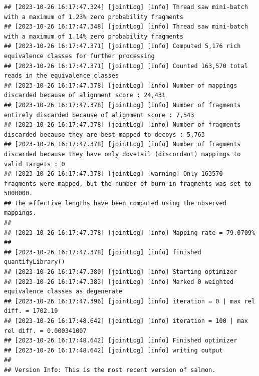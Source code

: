 \documentclass[
]{book}
\begin{document}
\begin{verbatim}
## [2023-10-26 16:17:47.324] [jointLog] [info] Thread saw mini-batch with a maximum of 1.23% zero probability fragments
## [2023-10-26 16:17:47.348] [jointLog] [info] Thread saw mini-batch with a maximum of 1.14% zero probability fragments
## [2023-10-26 16:17:47.371] [jointLog] [info] Computed 5,176 rich equivalence classes for further processing
## [2023-10-26 16:17:47.371] [jointLog] [info] Counted 163,570 total reads in the equivalence classes 
## [2023-10-26 16:17:47.378] [jointLog] [info] Number of mappings discarded because of alignment score : 24,431
## [2023-10-26 16:17:47.378] [jointLog] [info] Number of fragments entirely discarded because of alignment score : 7,543
## [2023-10-26 16:17:47.378] [jointLog] [info] Number of fragments discarded because they are best-mapped to decoys : 5,763
## [2023-10-26 16:17:47.378] [jointLog] [info] Number of fragments discarded because they have only dovetail (discordant) mappings to valid targets : 0
## [2023-10-26 16:17:47.378] [jointLog] [warning] Only 163570 fragments were mapped, but the number of burn-in fragments was set to 5000000.
## The effective lengths have been computed using the observed mappings.
## 
## [2023-10-26 16:17:47.378] [jointLog] [info] Mapping rate = 79.0709%
## 
## [2023-10-26 16:17:47.378] [jointLog] [info] finished quantifyLibrary()
## [2023-10-26 16:17:47.380] [jointLog] [info] Starting optimizer
## [2023-10-26 16:17:47.383] [jointLog] [info] Marked 0 weighted equivalence classes as degenerate
## [2023-10-26 16:17:47.396] [jointLog] [info] iteration = 0 | max rel diff. = 1702.19
## [2023-10-26 16:17:48.642] [jointLog] [info] iteration = 100 | max rel diff. = 0.000341007
## [2023-10-26 16:17:48.642] [jointLog] [info] Finished optimizer
## [2023-10-26 16:17:48.642] [jointLog] [info] writing output 
## 
## Version Info: This is the most recent version of salmon.

\end{verbatim}
\end{document}
